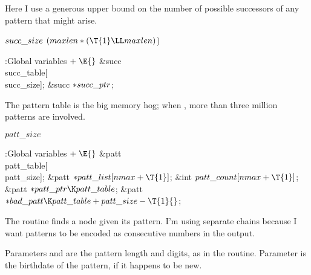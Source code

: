 Here I use a generous upper bound on the number of possible successors of
any pattern that might arise.

\Y\B\4\D$\\{succ\_size}$ \5
$(\\{maxlen}*(\T{1}\LL\\{maxlen}){}$)\par
\Y\B\4:Global variables\X${}\mathrel+\E{}$\6
\&{succ} \\{succ\_table}[\\{succ\_size}];\6
\&{succ} ${}{*}\\{succ\_ptr}{}$;\par
\fi

The pattern table is the big memory hog; when ,
more than
three million patterns are involved.

\Y\B\4\D$\\{patt\_size}$ \5
\par
\Y\B\4:Global variables\X${}\mathrel+\E{}$\6
\&{patt} \\{patt\_table}[\\{patt\_size}];\6
\&{patt} ${}{*}\\{patt\_list}[\\{nmax}+\T{1}]{}$;\6
\&{int} ${}\\{patt\_count}[\\{nmax}+\T{1}]{}$;\6
\&{patt} ${}{*}\\{patt\_ptr}\K\\{patt\_table}{}$;\6
\&{patt} ${}{*}\\{bad\_patt}\K\\{patt\_table}+\\{patt\_size}-\T{1}{}$;\par
\fi

The  routine finds a node given its pattern.
I'm using separate chains because I want patterns to be encoded as consecutive
numbers in the output.

Parameters  and  are the pattern length and digits, as in
the
 routine. Parameter  is the birthdate of the
pattern, if it
happens to be new.

